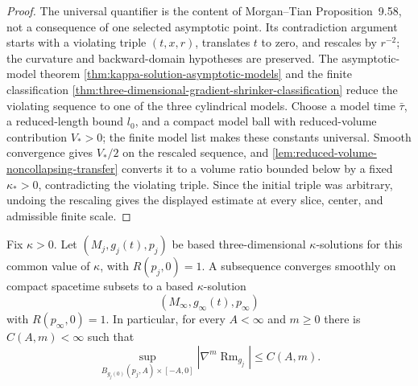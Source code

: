 \begin{proof}
The universal quantifier is the content of Morgan--Tian
Proposition~9.58, not a consequence of one selected asymptotic point.  Its
contradiction argument starts with a violating triple $(t,x,r)$, translates
$t$ to zero, and rescales by $r^{-2}$; the curvature and backward-domain
hypotheses are preserved.  The asymptotic-model theorem
\ref{thm:kappa-solution-asymptotic-models} and the finite classification
\ref{thm:three-dimensional-gradient-shrinker-classification} reduce the
violating sequence to one of the three cylindrical models.  Choose a model
time $\bar\tau$, a reduced-length bound $l_0$, and a compact model ball with
reduced-volume contribution $V_*>0$; the finite model list makes these
constants universal.  Smooth convergence gives $V_*/2$ on the rescaled
sequence, and
\ref{lem:reduced-volume-noncollapsing-transfer} converts it to a volume
ratio bounded below by a fixed $\kappa_*>0$, contradicting the violating
triple.  Since the initial triple was arbitrary, undoing the rescaling gives
the displayed estimate at every slice, center, and admissible finite scale.
\end{proof}

\begin{theorem}
\label{thm:kappa-solution-compactness}
\notready
Fix $\kappa>0$.  Let $(M_j,g_j(t),p_j)$ be based three-dimensional
$\kappa$-solutions for this common value of $\kappa$, with
$R(p_j,0)=1$.  A subsequence converges smoothly on compact spacetime
subsets to a based $\kappa$-solution
\[
 (M_\infty,g_\infty(t),p_\infty)
\]
with $R(p_\infty,0)=1$.
In particular, for every $A<\infty$ and $m\ge0$ there is $C(A,m)<\infty$
such that
\[
 \sup_{B_{g_j(0)}(p_j,A)\times[-A,0]}
 |\nabla^m\operatorname{Rm}_{g_j}|\le C(A,m).
\]
\end{theorem}

